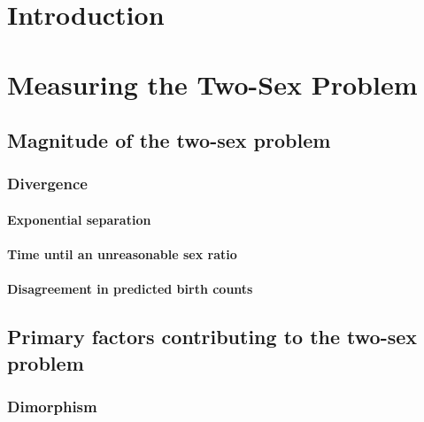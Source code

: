 \startthechapters 
 \chapter{Introduction}
 \label{chap:Intro}
 
 
\chapter{Measuring the Two-Sex Problem}
  
 
  \section{Magnitude of the two-sex problem}
    
    
    \subsection{Divergence}
      
      
      \subsubsection{Exponential separation}
        
      
      \subsubsection{Time until an unreasonable sex ratio}
        
      
      \subsubsection{Disagreement in predicted birth counts}
        
      
  \section{Primary factors contributing to the two-sex problem}

    \subsection{Dimorphism}
      
      
